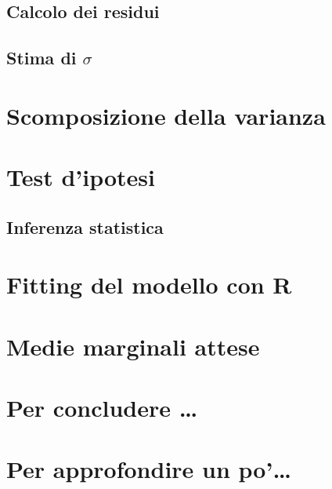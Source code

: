 \documentclass[a4paper,12pt,oneside]{book}
\begin{document}
\hypertarget{calcolo-dei-residui}{%
\subsection{Calcolo dei residui}\label{calcolo-dei-residui}}

\hypertarget{stima-di-sigma}{%
\subsection{\texorpdfstring{Stima di \(\sigma\)}{Stima di \textbackslash sigma}}\label{stima-di-sigma}}

\hypertarget{scomposizione-della-varianza}{%
\section{Scomposizione della varianza}\label{scomposizione-della-varianza}}

\hypertarget{test-dipotesi}{%
\section{Test d'ipotesi}\label{test-dipotesi}}

\hypertarget{inferenza-statistica}{%
\subsection{Inferenza statistica}\label{inferenza-statistica}}

\hypertarget{fitting-del-modello-con-r}{%
\section{Fitting del modello con R}\label{fitting-del-modello-con-r}}

\hypertarget{medie-marginali-attese}{%
\section{Medie marginali attese}\label{medie-marginali-attese}}

\hypertarget{per-concludere}{%
\section{Per concludere \ldots{}}\label{per-concludere}}

\hypertarget{per-approfondire-un-po-1}{%
\section{Per approfondire un po'\ldots{}}\label{per-approfondire-un-po-1}}
\end{document}
